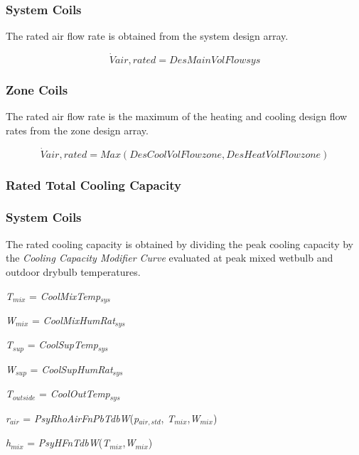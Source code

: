 \subsubsection{System Coils}\label{system-coils-4}

The rated air flow rate is obtained from the system design array.

\begin{equation}
\dot Vair,rated = DesMainVolFlowsys
\end{equation}

\subsubsection{Zone Coils}\label{zone-coils-4}

The rated air flow rate is the maximum of the heating and cooling design flow rates from the zone design array.

\begin{equation}
\dot Vair,rated = Max(DesCoolVolFlowzone,DesHeatVolFlowzone)
\end{equation}

\subsubsection{Rated Total Cooling Capacity}\label{rated-total-cooling-capacity-2}

\subsubsection{System Coils}\label{system-coils-5}

The rated cooling capacity is obtained by dividing the peak cooling capacity by the \emph{Cooling Capacity Modifier Curve} evaluated at peak mixed wetbulb and outdoor drybulb temperatures.

\emph{T\(_{mix}\)} = \emph{CoolMixTemp\(_{sys}\)}

\emph{W\(_{mix}\)} = \emph{CoolMixHumRat\(_{sys}\)}

\emph{T\(_{sup}\)} = \emph{CoolSupTemp\(_{sys}\)}

\emph{W\(_{sup}\)} = \emph{CoolSupHumRat\(_{sys}\)}

\emph{T\(_{outside}\)} = \emph{CoolOutTemp\(_{sys}\)}

\emph{r\(_{air}\)} = \emph{PsyRhoAirFnPbTdbW}(\emph{p\(_{air,std}\)}, \emph{T\(_{mix}\)},\emph{W\(_{mix}\)})

\emph{h\(_{mix}\)} = \emph{PsyHFnTdbW}(\emph{T\(_{mix}\)},\emph{W\(_{mix}\)})

